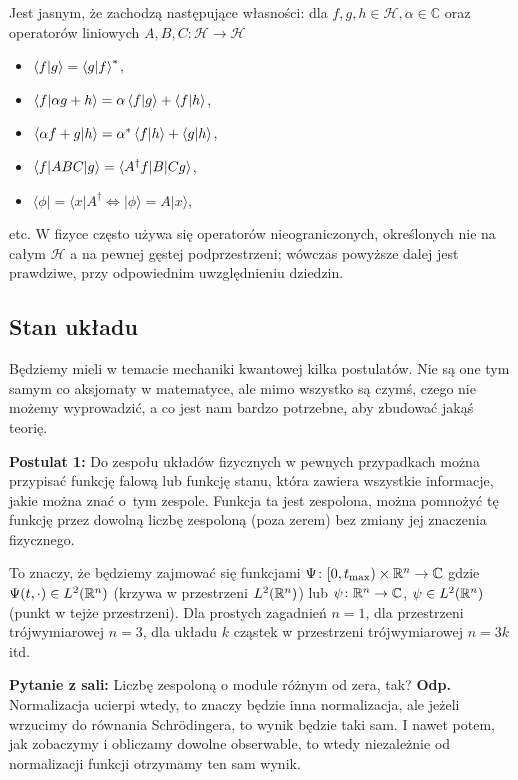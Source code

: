 Jest jasnym, że zachodzą następujące własności: dla
$f, g, h \in \mathcal H, \alpha \in \mathbb C$ oraz operatorów
liniowych $A, B, C\colon \mathcal H \to \mathcal H$
\begin{itemize}
    \item $\braket{f|g} = \braket{g|f}^*$,
    \item $\braket{f|\alpha g + h} = \alpha \braket{f|g} + \braket{f|h}$,
    \item $\braket{\alpha f + g|h} = \alpha^* \braket{f|h} + \braket{g|h}$,
    \item $\braket{f|ABC|g} = \braket{A^\dagger f| B | C g}$,
    \item $\langle \phi |  = \langle x | A^{\dagger} \iff | \phi \rangle = A | x \rangle$,
\end{itemize}
etc.
W fizyce często używa się operatorów nieograniczonych, określonych nie na
całym $\mathcal H$ a na pewnej gęstej podprzestrzeni; wówczas powyższe
dalej jest prawdziwe, przy odpowiednim uwzględnieniu dziedzin.




\subsection{Stan układu}
Będziemy mieli w temacie mechaniki kwantowej kilka postulatów. Nie są one tym samym co aksjomaty w matematyce, ale mimo wszystko są czymś, czego nie możemy wyprowadzić, a co jest nam bardzo potrzebne, aby zbudować jakąś teorię.

\textbf{Postulat 1:} Do zespołu układów fizycznych w pewnych przypadkach można przypisać funkcję falową lub funkcję stanu, która zawiera wszystkie informacje, jakie można znać o~tym zespole. Funkcja ta jest zespolona, można pomnożyć tę funkcję przez dowolną liczbę zespoloną (poza zerem) bez zmiany jej znaczenia fizycznego.

To znaczy, że będziemy zajmować się funkcjami
$\Psi \colon [0, t_{\text{max}}) \times \mathbb R^n \to \mathbb C$ gdzie $\Psi(t, \cdot ) \in L^2(\mathbb R^n)$
(krzywa w przestrzeni $L^2(\mathbb R^n)$)
lub $\psi \colon \mathbb R^n \to \mathbb C$, $\psi \in L^2(\mathbb R^n)$ (punkt w tejże przestrzeni).
Dla prostych zagadnień $n=1$, dla przestrzeni trójwymiarowej $n=3$, dla
układu $k$ cząstek w przestrzeni trójwymiarowej $n=3k$ itd.

\textbf{Pytanie z sali:} Liczbę zespoloną o module różnym od zera, tak? \textbf{Odp.} Normalizacja ucierpi wtedy, to znaczy będzie inna normalizacja, ale jeżeli wrzucimy do równania Schrödingera, to wynik będzie taki sam. I nawet potem, jak zobaczymy i obliczamy dowolne obserwable, to wtedy niezależnie od normalizacji funkcji otrzymamy ten sam wynik.

